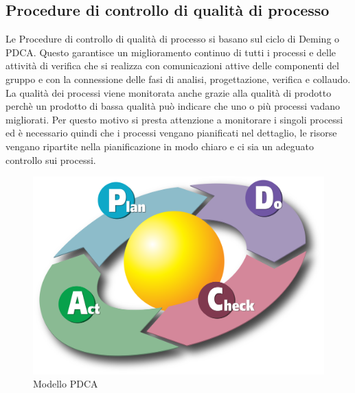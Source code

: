 \subsection{Procedure di controllo di qualità di processo}
Le Procedure di controllo di qualità di processo si basano sul ciclo di Deming o PDCA. Questo garantisce un miglioramento continuo di tutti i processi e delle attività di verifica che si realizza con comunicazioni attive delle componenti del gruppo e con la connessione delle fasi di analisi, progettazione, verifica e collaudo.
La qualità dei processi viene monitorata anche grazie alla qualità di prodotto perchè un prodotto di bassa qualità può indicare che uno o più processi vadano migliorati. Per questo motivo si presta attenzione a monitorare i singoli processi ed è necessario quindi che i processi vengano pianificati nel dettaglio, le risorse vengano ripartite nella pianificazione in modo chiaro e ci sia un adeguato controllo sui processi.
\begin{figure}[h!]
		\centering
		\includegraphics[scale=.6]{img/2000px-PDCA_Cycle.svg.png}
		\caption{Modello PDCA}
		\label{fig:ModelloSpy}
\end{figure}
